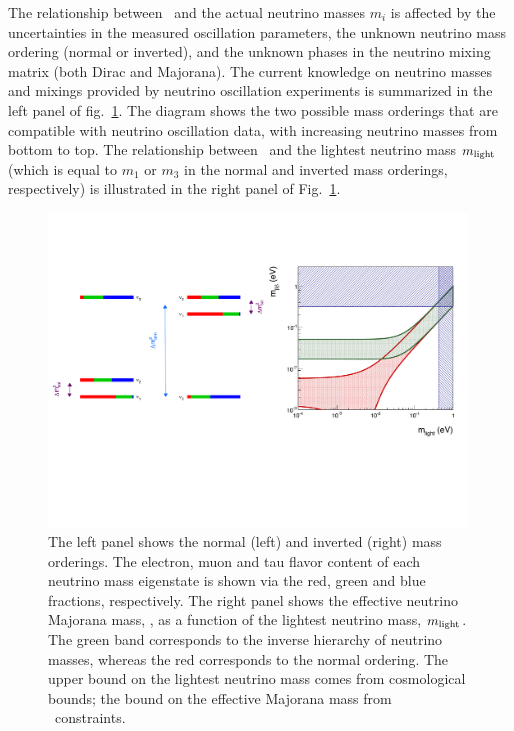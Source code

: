 The relationship between \mbb\ and the actual neutrino masses $m_i$ is affected by the uncertainties in the measured oscillation parameters, the unknown neutrino mass ordering (normal or inverted), and the unknown phases in the neutrino mixing matrix (both Dirac and Majorana). The current knowledge on neutrino masses and mixings provided by neutrino oscillation experiments is summarized in the left panel of fig.~\ref{fig:numass_ordering}. The diagram shows the two possible mass orderings that are compatible with neutrino oscillation data, with increasing neutrino masses from bottom to top. The relationship between \mbb\ and the lightest neutrino mass $m_{\rm light}$ (which is equal to $m_1$ or $m_3$ in the normal and inverted mass orderings, respectively) is illustrated in the right panel of Fig.~\ref{fig:numass_ordering}.

\begin{figure}[h]
\centering
\includegraphics[width=0.99\textwidth]{img/numassmix.pdf}
\caption{\small The left panel shows the normal (left) and inverted (right) mass orderings. The electron, muon and tau flavor content of each neutrino mass eigenstate is shown via the red, green and blue fractions, respectively. The right panel shows the effective neutrino Majorana mass, \mbb, as a function of the lightest neutrino mass, $m_{\rm light}$. The green band corresponds to the inverse hierarchy of neutrino masses, whereas the red corresponds to the normal ordering. The upper bound on the lightest neutrino mass comes from cosmological bounds; the bound on the effective Majorana mass from \bbonu\ constraints.} \label{fig:numass_ordering}
\end{figure}

